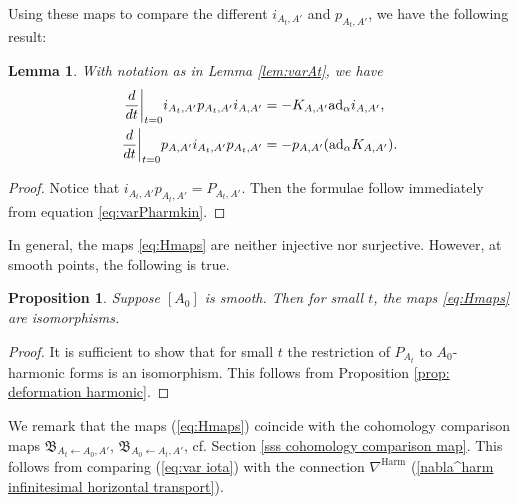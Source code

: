 \documentclass[11pt,a4paper]{amsart}
\theoremstyle{plain} %
\newtheorem{lem}[thm]{Lemma}
\newtheorem{prop}[thm]{Proposition}
\theoremstyle{definition}
\theoremstyle{remark}
\newcommand{\mr}{\mathrm}
\newcommand{\la}{\leftarrow}
\newcommand\restr[2]{{%
  \left.\kern-\nulldelimiterspace %
  #1 %
  \vphantom{\big|} %
  \right|_{#2} %
  }}
\begin{document}
Using these maps to compare the different $i_{A_t,A'}$ and $p_{A_t,A'}$, we have the following result:
   \begin{lem}
   With notation as in Lemma \ref{lem:varAt}, we have 
   \begin{align}
     \restr{\frac{d}{dt}}{t=0} i_{A_t,A'}p_{A_t,A'}i_{A,A'} &= -K_{A,A'}\mathrm{ad}_\alpha  i_{A,A'} \label{eq:var iota}, \\ 
    \restr{\frac{d}{dt}}{t=0} p_{A,A'}i_{A_t,A'}p_{A_t,A'} &= -p_{A,A'}(\mathrm{ad}_\alpha K_{A,A'})\label{eq:var P}.
\end{align}    
   \end{lem}
\begin{proof}
Notice that $i_{A_t ,A'}p_{A_t,A'} = P_{A_t,A'}$. Then the formulae follow immediately from equation \eqref{eq:varPharmkin}. 
\end{proof}
In general, the maps \eqref{eq:Hmaps} are neither injective nor surjective. However, at smooth points, the following is true. 
\begin{prop}
Suppose $[A_0]$ is smooth. Then for small $t$, the maps \eqref{eq:Hmaps} are %
isomorphisms. 
\end{prop}
\begin{proof}
It is sufficient to show that for small $t$ the restriction of $P_{A_t}$ to $A_0$-harmonic forms is an isomorphism. This follows from Proposition \ref{prop: deformation harmonic}.
\end{proof}

We remark that the maps (\ref{eq:Hmaps}) coincide with the cohomology comparison maps $\mathfrak{B}_{A_t\la A_0,A'}$, $\mathfrak{B}_{A_0\la A_t,A'}$, cf. Section \ref{sss cohomology comparison map}. This follows from comparing (\ref{eq:var iota}) with the connection $\nabla^\mr{Harm}$ (\ref{nabla^harm infinitesimal horizontal transport}).
\end{document}
